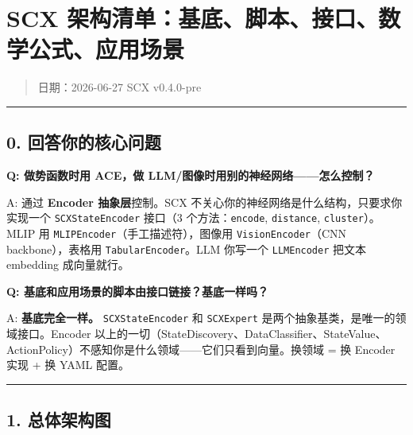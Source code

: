 \documentclass[
  12pt,
]{ctexart}
\author{SCX}
\date{2026}
\begin{document}
\section{SCX
架构清单：基底、脚本、接口、数学公式、应用场景}\label{scx-ux67b6ux6784ux6e05ux5355ux57faux5e95ux811aux672cux63a5ux53e3ux6570ux5b66ux516cux5f0fux5e94ux7528ux573aux666f}

\begin{quote}
日期：2026-06-27 \textbar{} SCX v0.4.0-pre
\end{quote}

\begin{center}\rule{0.5\linewidth}{0.5pt}\end{center}

\subsection{0.
回答你的核心问题}\label{ux56deux7b54ux4f60ux7684ux6838ux5fc3ux95eeux9898}

\textbf{Q: 做势函数时用 ACE，做
LLM/图像时用别的神经网络------怎么控制？}

A: 通过 \textbf{Encoder 抽象层}控制。SCX
不关心你的神经网络是什么结构，只要求你实现一个 \texttt{SCXStateEncoder}
接口（3 个方法：\texttt{encode}, \texttt{distance},
\texttt{cluster}）。MLIP 用 \texttt{MLIPEncoder}（手工描述符），图像用
\texttt{VisionEncoder}（CNN backbone），表格用
\texttt{TabularEncoder}。LLM 你写一个 \texttt{LLMEncoder} 把文本
embedding 成向量就行。

\textbf{Q: 基底和应用场景的脚本由接口链接？基底一样吗？}

A: \textbf{基底完全一样。} \texttt{SCXStateEncoder} 和
\texttt{SCXExpert} 是两个抽象基类，是唯一的领域接口。Encoder
以上的一切（StateDiscovery、DataClassifier、StateValue、ActionPolicy）不感知你是什么领域------它们只看到向量。换领域
= 换 Encoder 实现 + 换 YAML 配置。

\begin{center}\rule{0.5\linewidth}{0.5pt}\end{center}

\subsection{1. 总体架构图}\label{ux603bux4f53ux67b6ux6784ux56fe}
\end{document}
